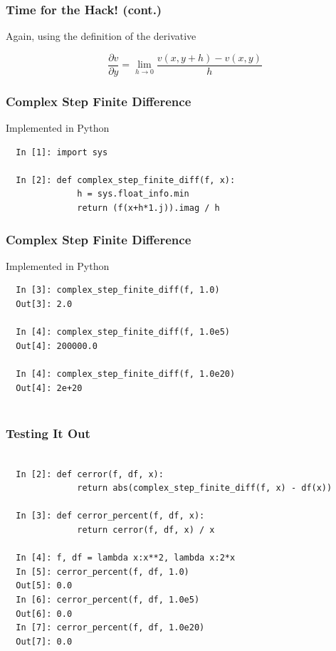 \documentclass{beamer}
\def\R{\mathbb{R}}                     %
\begin{document}
\begin{frame}
\frametitle{Time for the Hack! (cont.)}

  Again, using the definition of the derivative

  \[ \frac{\partial v}{\partial y} = \lim_{h \to 0} \frac{v(x,y+h) - v(x,y)}{h} \]

\pause \uncover{

  Since $y = 0$ for all $\bar{z} \in \R$,

  \[ \frac{\partial v}{\partial y} = \lim_{h \to 0} \frac{v(x,h) - v(x,0)}{h} \]
}
\pause {}
\pause {}

\end{frame}

\begin{frame}[fragile]
\frametitle{Complex Step Finite Difference}

Implemented in Python


\begin{lstlisting}
  In [1]: import sys

  In [2]: def complex_step_finite_diff(f, x):
              h = sys.float_info.min
              return (f(x+h*1.j)).imag / h
\end{lstlisting}
\end{frame}

\begin{frame}[fragile]
\frametitle{Complex Step Finite Difference}

Implemented in Python


\begin{lstlisting}
  In [3]: complex_step_finite_diff(f, 1.0)
  Out[3]: 2.0

  In [4]: complex_step_finite_diff(f, 1.0e5)
  Out[4]: 200000.0

  In [4]: complex_step_finite_diff(f, 1.0e20)
  Out[4]: 2e+20


\end{lstlisting}
\end{frame}

\begin{frame}[fragile]
\frametitle{Testing It Out}

\begin{lstlisting}

  In [2]: def cerror(f, df, x):
              return abs(complex_step_finite_diff(f, x) - df(x))

  In [3]: def cerror_percent(f, df, x):
              return cerror(f, df, x) / x

  In [4]: f, df = lambda x:x**2, lambda x:2*x
  In [5]: cerror_percent(f, df, 1.0)
  Out[5]: 0.0
  In [6]: cerror_percent(f, df, 1.0e5)
  Out[6]: 0.0
  In [7]: cerror_percent(f, df, 1.0e20)
  Out[7]: 0.0
\end{lstlisting}

\end{frame}
\end{document}
